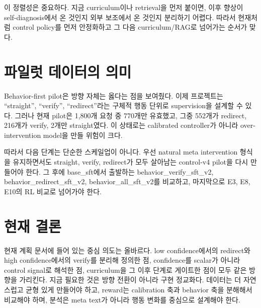 \documentclass[11pt]{article}
\begin{document}
이 정렬성은 중요하다. 지금 curriculum이나 retrieval을 먼저 붙이면, 이후 향상이 self-diagnosis에서 온 것인지 외부 보조에서 온 것인지 분리하기 어렵다. 따라서 현재처럼 control policy를 먼저 안정화하고 그 다음 curriculum/RAG로 넘어가는 순서가 맞다.

\section*{파일럿 데이터의 의미}
Behavior-first pilot은 방향 자체는 옳다는 점을 보여줬다. 이제 프로젝트는 ``straight'', ``verify'', ``redirect''라는 구체적 행동 단위로 supervision을 설계할 수 있다. 그러나 현재 pilot은 1,800개 요청 중 770개만 유효했고, 그중 552개가 redirect, 216개가 verify, 2개만 straight였다. 이 상태로는 calibrated controller가 아니라 over-intervention model을 만들 위험이 크다.

따라서 다음 단계는 단순한 스케일업이 아니다. 우선 natural meta intervention 형식을 유지하면서도 straight, verify, redirect가 모두 살아남는 control-v4 pilot을 다시 만들어야 한다. 그 후에 base\_sft에서 출발하는 behavior\_verify\_sft\_v2, behavior\_redirect\_sft\_v2, behavior\_all\_sft\_v2를 비교하고, 마지막으로 E3, E8, E10의 RL 비교로 넘어가야 한다.

\section*{현재 결론}
현재 계획 문서에 들어 있는 중심 의도는 올바르다. low confidence에서의 redirect와 high confidence에서의 verify를 분리해 정의한 점, confidence를 scalar가 아니라 control signal로 해석한 점, curriculum을 그 이후 단계로 게이트한 점이 모두 같은 방향을 가리킨다. 지금 필요한 것은 방향 전환이 아니라 구현 정교화다. 데이터는 더 자연스럽고 균형 있게 만들어야 하고, reward는 calibration 축과 behavior 축을 분해해서 비교해야 하며, 분석은 meta text가 아니라 행동 변화를 중심으로 설계해야 한다.
\end{document}
